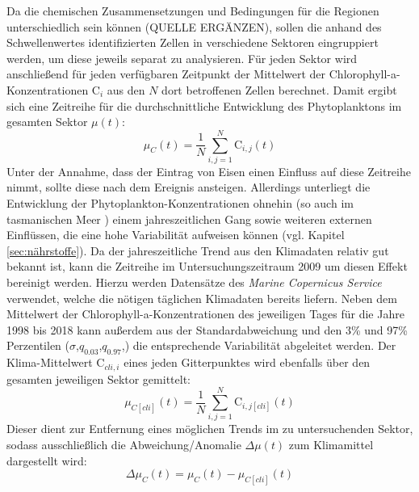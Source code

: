 \documentclass[12pt,a4paper,onecolumn,draft]{scrartcl}
\begin{document}
Da die chemischen Zusammensetzungen und Bedingungen für die Regionen unterschiedlich sein können (QUELLE ERGÄNZEN), sollen die anhand des Schwellenwertes identifizierten Zellen in verschiedene Sektoren eingruppiert werden, um diese jeweils separat zu analysieren. Für jeden Sektor wird anschließend für jeden verfügbaren Zeitpunkt der Mittelwert der Chlorophyll-a-Konzentrationen $\text{C}_i$ aus den $N$ dort betroffenen Zellen berechnet. Damit ergibt sich eine Zeitreihe für die durchschnittliche Entwicklung des Phytoplanktons im gesamten Sektor $\mu(t)$:
\begin{equation}
\mu_C(t) = \frac{1}{N}\sum\limits_{i,j=1}^{N} \text{C}_{i,j}(t)
\end{equation}
Unter der Annahme, dass der Eintrag von Eisen einen Einfluss auf diese Zeitreihe nimmt, sollte diese nach dem Ereignis ansteigen. Allerdings unterliegt die Entwicklung der Phytoplankton-Konzentrationen ohnehin (so auch im tasmanischen Meer \citep{Tilburg.2002}) einem jahreszeitlichen Gang sowie weiteren externen Einflüssen, die eine hohe Variabilität aufweisen können (vgl. Kapitel \ref{sec:nährstoffe}). Da der jahreszeitliche Trend aus den Klimadaten relativ gut bekannt ist, kann die Zeitreihe im Untersuchungszeitraum 2009 um diesen Effekt bereinigt werden. Hierzu werden Datensätze des \textit{Marine Copernicus Service} verwendet, welche die nötigen täglichen Klimadaten bereits liefern. Neben dem Mittelwert der Chlorophyll-a-Konzentrationen des jeweiligen Tages für die Jahre 1998 bis 2018 kann außerdem aus der Standardabweichung und den 3\% und 97\% Perzentilen ($\sigma$,$q_{0.03}$,$q_{0.97}$,) die entsprechende Variabilität abgeleitet werden. Der Klima-Mittelwert $\text{C}_{cli,i}$ eines jeden Gitterpunktes wird ebenfalls über den gesamten jeweiligen Sektor gemittelt:
\begin{equation}
\mu_{C[cli]}(t) = \frac{1}{N}\sum\limits_{i,j=1}^{N} \text{C}_{i,j[cli]}(t)
\end{equation}
Dieser dient zur Entfernung eines möglichen Trends im zu untersuchenden Sektor, sodass ausschließlich die Abweichung/Anomalie $\Delta \mu(t)$ zum Klimamittel dargestellt wird:
\begin{equation}
\Delta \mu_C(t) = \mu_C(t) - \mu_{C[cli]}(t) \label{eq:cli_anomalie}
\end{equation} 
\end{document}
